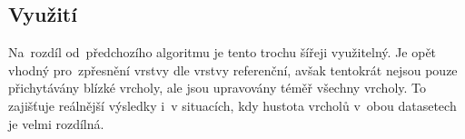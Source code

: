 
\subsection{Využití}
\label{ca-vyuziti}

Na~rozdíl od~předchozího algoritmu je tento trochu šířeji využitelný. Je opět 
vhodný pro~zpřesnění vrstvy dle vrstvy referenční, avšak tentokrát nejsou 
pouze přichytávány blízké vrcholy, ale jsou upravovány téměř všechny vrcholy. 
To zajišťuje reálnější výsledky i~v situacích, kdy hustota vrcholů v~obou 
datasetech je velmi rozdílná.

